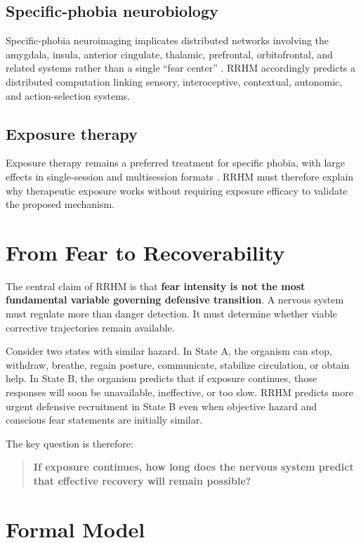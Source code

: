 \documentclass[11pt]{article}
\begin{document}
\subsection{Specific-phobia neurobiology}

Specific-phobia neuroimaging implicates distributed networks involving the amygdala, insula, anterior cingulate, thalamic, prefrontal, orbitofrontal, and related systems rather than a single ``fear center'' \cite{linares2012,etkin2007}. RRHM accordingly predicts a distributed computation linking sensory, interoceptive, contextual, autonomic, and action-selection systems.

\subsection{Exposure therapy}

Exposure therapy remains a preferred treatment for specific phobia, with large effects in single-session and multisession formats \cite{odgers2022}. RRHM must therefore explain why therapeutic exposure works without requiring exposure efficacy to validate the proposed mechanism.

\section{From Fear to Recoverability}

The central claim of RRHM is that \textbf{fear intensity is not the most fundamental variable governing defensive transition}. A nervous system must regulate more than danger detection. It must determine whether viable corrective trajectories remain available.

Consider two states with similar hazard. In State A, the organism can stop, withdraw, breathe, regain posture, communicate, stabilize circulation, or obtain help. In State B, the organism predicts that if exposure continues, those responses will soon be unavailable, ineffective, or too slow. RRHM predicts more urgent defensive recruitment in State B even when objective hazard and conscious fear statements are initially similar.

The key question is therefore:

\begin{quote}
\textbf{If exposure continues, how long does the nervous system predict that effective recovery will remain possible?}
\end{quote}

\section{Formal Model}
\end{document}
